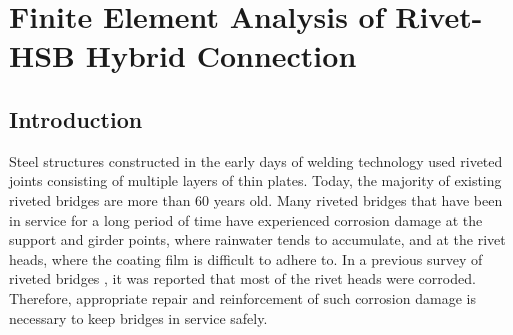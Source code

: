 \chapter{Finite Element Analysis of Rivet-HSB Hybrid Connection}
\label{ch4}

\begin{spacing}{1.25} %
\minitoc %
\end{spacing} %
\onehalfspacing %



\section{Introduction}

Steel structures constructed in the early days of welding technology used riveted joints consisting of multiple layers of thin plates. Today, the majority of existing riveted bridges are more than 60 years old. Many riveted bridges that have been in service for a long period of time have experienced corrosion damage at the support and girder points, where rainwater tends to accumulate, and at the rivet heads, where the coating film is difficult to adhere to. In a previous survey of riveted bridges \cite{okamoto2011investigation}, it was reported that most of the rivet heads were corroded. Therefore, appropriate repair and reinforcement of such corrosion damage is necessary to keep bridges in service safely.

